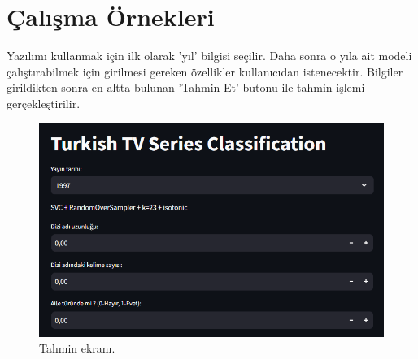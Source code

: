 \section{Çalışma Örnekleri}
Yazılımı kullanmak için ilk olarak 'yıl' bilgisi seçilir. Daha sonra o yıla ait modeli çalıştırabilmek için girilmesi gereken özellikler kullanıcıdan istenecektir. Bilgiler girildikten sonra en altta bulunan 'Tahmin Et' butonu ile tahmin işlemi gerçekleştirilir.

\begin{figure}[h]
  \centering
  \includegraphics[width=1.0\textwidth]{ekran.png}
  \caption{Tahmin ekranı.}
  \label{fig:resim_2}
\end{figure}

\newpage
